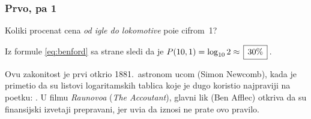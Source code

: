 \subsubsection{Prvo, pa 1}

\def\fibonacci#1#2#3{%
\newcount\a \a=#1
\newcount\b \b=#2
\number\a,~\number\b
\newcount\t
\newcount\n \n=#3 \advance\n-2
\loop
  \t=\b \advance\b\a \a=\t
  , \number\b
  \advance\n-1
\ifnum \n>0 \repeat}

\zadatak 
Koliki procenat cena {\sl od igle do lokomotive\/}
po{\cv}i{\nj}e cifrom~1?

\resenje Iz formule \eqref{eq:benford} sa strane \pageref{eq:benford} sledi da je $P(10,1)=\logten 2 \approx \ram{30\%}$.

\dodatak Ovu zakonitost je prvi otkrio 1881.\ astronom {\Nj}ucom (Simon Newcomb), kada je primetio da su
listovi logaritamskih tablica koje je dugo koristio najpr{\lj}aviji
na po{\cv}etku: .
U filmu {\sl Ra{\cv}unovo{\dj}a\/} ({\sl The Accoutant\/}), glavni lik (Ben Afflec) otkriva
da su finansijski izve{\sv}taji preprav{\lj}ani, jer uvi{\dj}a da iznosi
ne prate ovo pravilo.